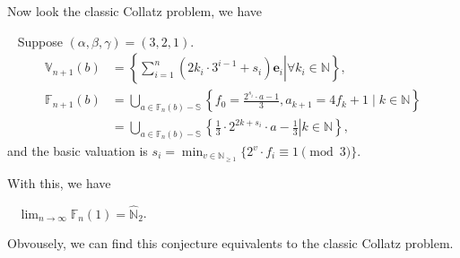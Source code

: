 Now look the classic Collatz problem, we have
\begin{example}~\label{coro:layers-of-reduce-space-and-source-value-set-on-3-2-1}
    Suppose $(\alpha, \beta, \gamma) = (3,2,1)$.
    \begin{align*}
        \mathbb{V}_{n+1}(b) &= \left\{ \left.\sum_{i=1}^{n}(2k_i\cdot 3^{i-1} + s_i)\bm{e}_{i} \right\vert  \forall k_i\in \mathbb{N} \right\},\\
        \mathbb{F}_{n+1}(b) &= \bigcup_{a\in \mathbb{F}_{n}(b) - \mathbb{S}} \left\{f_0 = \frac{2^{s_i}\cdot a  - 1}{3}, a_{k+1} = 4f_{k} + 1 \mid k\in\mathbb{N}\right\} \\
        &= \bigcup_{a\in \mathbb{F}_{n}(b) - \mathbb{S}} \left\{\left.\frac{1}{3}\cdot2^{2k + s_i}\cdot a - \frac{1}{3}\right\vert k\in \mathbb{N}\right\},
    \end{align*}
    and the basic valuation is $s_i = \min_{v\in\mathbb{N}_{\ge1}}\{2^{v}\cdot f_i \equiv 1\pmod{3}\}$.
\end{example}
With this, we have
\begin{conjecture}~\label{conj:source-value-of-1-cover-all-odd-numbers}
    $\lim_{n\to\infty}\mathbb{F}_n(1) =\widehat{\mathbb{N}}_{{2}}$.
\end{conjecture}
Obvousely, we can find this conjecture equivalents to the classic Collatz problem.
